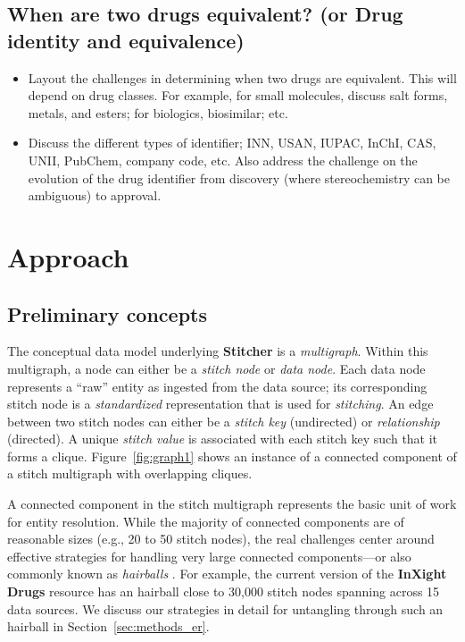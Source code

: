 \documentclass{bioinfo}
\newcommand\st{\textbf{Stitcher}}
\newcommand\ix{\textbf{InXight Drugs}}
\begin{document}
\subsection{When are two drugs equivalent? (or Drug identity and equivalence)}
\begin{itemize}
\item Layout the challenges in determining when two drugs are equivalent. This will depend on drug classes. For example, for small molecules, discuss salt forms, metals, and esters; for biologics, biosimilar; etc.
\item Discuss the different types of identifier; INN, USAN, IUPAC, InChI, CAS, UNII, PubChem, company code, etc. Also address the challenge on the evolution of the drug identifier from discovery (where stereochemistry can be ambiguous) to approval.
\end{itemize}


\section{Approach}

\subsection{Preliminary concepts}
The conceptual data model underlying \st{} is a \emph{multigraph}. Within this multigraph, a node can either be a \emph{stitch node} or \emph{data node}. Each data node represents a ``raw'' entity as ingested from the data source; its corresponding stitch node is a \emph{standardized} representation that is used for \emph{stitching}. An edge between two stitch nodes can either be a \emph{stitch key} (undirected) or \emph{relationship} (directed). A unique \emph{stitch value} is associated with each stitch key such that it forms a clique. Figure~\ref{fig:graph1} shows an instance of a connected component of a stitch multigraph with overlapping cliques.

A connected component in the stitch multigraph represents the basic unit of work for entity resolution. While the majority of connected components are of reasonable sizes (e.g., 20 to 50 stitch nodes), the real challenges center around effective strategies for handling very large connected components---or also commonly known as \emph{hairballs} \citep{Croset2015}. For example, the current version of the \ix{} resource has an hairball close to 30,000 stitch nodes spanning across 15 data sources. We discuss our strategies in detail for untangling through such an hairball in Section~\ref{sec:methods_er}.
\end{document}
